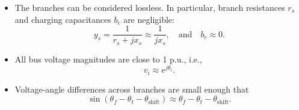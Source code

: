 \documentclass[12pt]{article}
\numberwithin{equation}{section}
\numberwithin{table}{section}
\numberwithin{figure}{section}
\begin{document}
\begin{itemize}
\item The branches can be considered lossless.
In particular, branch resistances $r_s$ and charging capacitances $b_c$ are negligible:
\begin{equation}
y_s = \frac{1}{r_s + j x_s} \approx \frac{1}{j x_s},
\quad \text{and} \quad b_c \approx 0.
\label{eq:lossless}
\end{equation}
\item All bus voltage magnitudes are close to 1 p.u., i.e.,
\begin{equation}
v_i \approx e^{j \theta_i}.
\label{eq:V1}
\end{equation}
\item Voltage-angle differences across branches are small enough that
\begin{equation}
\sin( \theta_f - \theta_t - \theta_\mathrm{shift} )
\approx \theta_f - \theta_t - \theta_\mathrm{shift}.
\label{eq:sin}
\end{equation}
\end{itemize}
\end{document}
